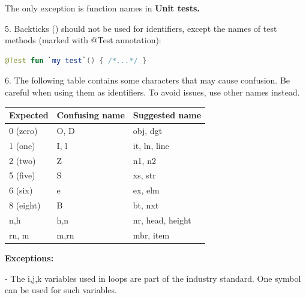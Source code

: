 {{{{The only exception is function names in \textbf{Unit tests.}



5.	Backticks (\textbf{}) should not be used for identifiers, except the names of test methods (marked with @Test annotation):

\begin{lstlisting}[language=Kotlin]
 @Test fun `my test`() { /*...*/ }
\end{lstlisting}
6.  The following table contains some characters that may cause confusion. Be careful when using them as identifiers. To avoid issues, use other names instead.

\begin{center}

\begin{tabular}{ |p{5.0cm}|p{5.0cm}|p{5.0cm}| }

\hline

Expected&Confusing name&Suggested name\\

\hline

 0 (zero)      & O, D                     & obj, dgt         \\

 1 (one)       & I, l                     & it, ln, line     \\

 2 (two)       & Z                        & n1, n2           \\

 5 (five)      & S                        & xs, str          \\

 6 (six)       & e                        & ex, elm          \\

 8 (eight)     & B                        & bt, nxt          \\

 n,h           & h,n                      & nr, head, height \\

 rn, m         & m,rn                     & mbr, item        \\

\hline

\end{tabular}

\end{center}

\textbf{Exceptions:}

- The i,j,k variables used in loops are part of the industry standard. One symbol can be used for such variables.

}}}}
